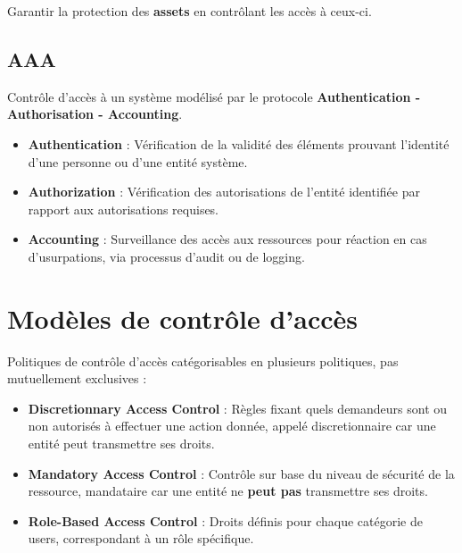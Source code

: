 \documentclass{report}
\begin{document}
		Garantir la protection des \textbf{assets} en contrôlant les accès à ceux-ci.\\

		\subsection{AAA}

			Contrôle d'accès à un système modélisé par le protocole \textbf{Authentication - Authorisation - Accounting}.\\

			\begin{itemize}
				\item \textbf{Authentication} : Vérification de la validité des éléments prouvant l'identité d'une personne ou d'une entité système.\\
				\item \textbf{Authorization} : Vérification des autorisations de l'entité identifiée par rapport aux autorisations requises.\\
				\item \textbf{Accounting} : Surveillance des accès aux ressources pour réaction en cas d'usurpations, via processus d'audit ou de logging.\\
			\end{itemize}

	\section{Modèles de contrôle d'accès}

		Politiques de contrôle d'accès catégorisables en plusieurs politiques, pas mutuellement exclusives : \\

		\begin{itemize}
			\item \textbf{Discretionnary Access Control} : Règles fixant quels demandeurs sont ou non autorisés à effectuer une action donnée, appelé discretionnaire car une entité peut transmettre ses droits.\\
			\item \textbf{Mandatory Access Control} : Contrôle sur base du niveau de sécurité de la ressource, mandataire car une entité ne \textbf{peut pas} transmettre ses droits.\\
			\item \textbf{Role-Based Access Control} : Droits définis pour chaque catégorie de users, correspondant à un rôle spécifique.\\
		\end{itemize}
\end{document}
